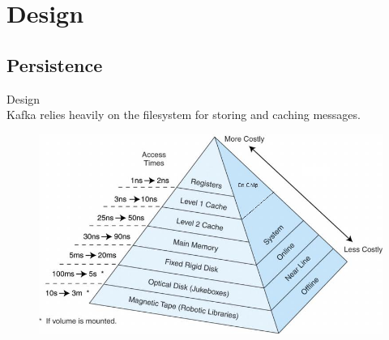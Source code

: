\section{Design}
\subsection{Persistence}
\begin{frame}[plain,t]{Design} %
     \\
    \vspace{2ex}
    Kafka relies heavily on the filesystem for storing and caching messages. 
    
    \begin{figure}
        \centering
        \includegraphics[width=0.8\linewidth]{image/0212}
        \label{fig:0212}
    \end{figure}
    
    
    
\end{frame}
